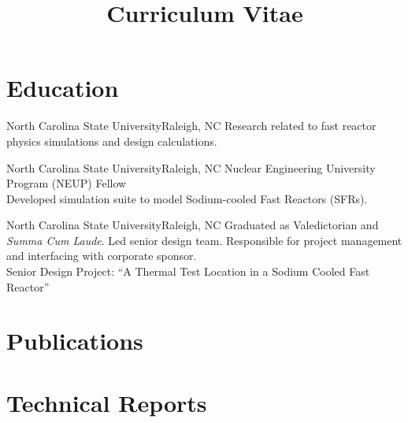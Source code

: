 \documentclass[letterpaper,12pt,nocolor,final]{moderncv}
\title{Curriculum Vitae}
\begin{document}
\maketitle

\nocite{*}


\section{Education}  

    {North Carolina State University}{Raleigh, NC}{}{
    Research related to fast reactor physics simulations and design calculations.}
  \vspace{\topsep}

    {North Carolina State University}{Raleigh, NC}{}{
    Nuclear Engineering University Program (NEUP) Fellow \\
    Developed simulation suite to model Sodium-cooled Fast Reactors (SFRs).
    \vspace{-1\topsep}
    \printbibliography[keyword={mastersthesis},heading=none]}
  \vspace{\topsep}

    {North Carolina State University}{Raleigh, NC}{}{
    Graduated as Valedictorian and \textit{Summa Cum Laude}.
    Led senior design team. Responsible for project management and interfacing with corporate sponsor. \\
    Senior Design Project: ``A Thermal Test Location in a Sodium Cooled Fast Reactor''}


\section{Publications}
  \printbibliography[keyword={publications},heading=none]

\section{Technical Reports}
  \printbibliography[keyword={techreport},heading=none]
\end{document}
